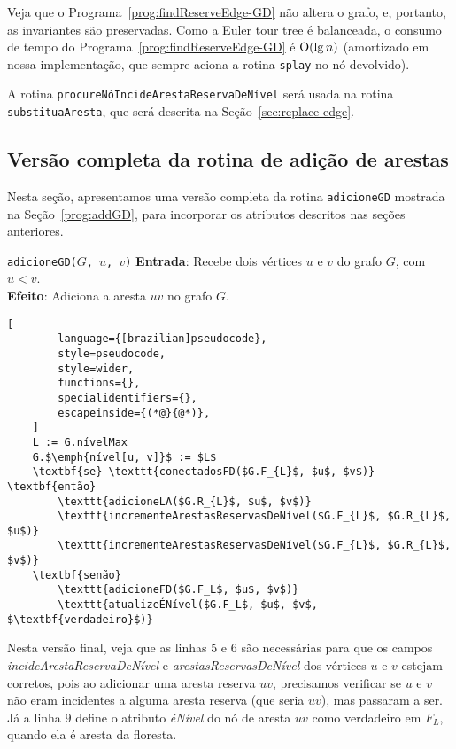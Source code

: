 Veja que o Programa~\ref{prog:findReserveEdge-GD} não altera o grafo, e, portanto, as invariantes são preservadas. Como a Euler tour tree é balanceada, o consumo de tempo do Programa~\ref{prog:findReserveEdge-GD} é $\mathrm{O}(\lg n)$ (amortizado em nossa implementação, que sempre aciona a rotina \texttt{splay} no nó devolvido).

A rotina \texttt{procureNóIncideArestaReservaDeNível} será usada na rotina \texttt{substituaAresta}, que será descrita na Seção~\ref{sec:replace-edge}.

\subsection{Versão completa da rotina de adição de arestas}
\label{sec:code-edge-addition-second-version}

Nesta seção, apresentamos uma versão completa da rotina \texttt{adicioneGD} mostrada na Seção~\ref{prog:addGD}, para incorporar os atributos descritos nas seções anteriores.

\begin{programruledcaption}{\texttt{adicioneGD($G$, $u$, $v$)} \label{prog:addGD-version2}}
    \noindent\textbf{Entrada}: Recebe dois vértices $u$ e $v$ do grafo $G$, com $u < v$. \\
    \textbf{Efeito}: Adiciona a aresta $uv$ no grafo $G$.
    \vspace{-0.5\baselineskip}
    \begin{lstlisting}[
        language={[brazilian]pseudocode},
        style=pseudocode,
        style=wider,
        functions={},
        specialidentifiers={},
        escapeinside={(*@}{@*)},
    ]
    L := G.nívelMax
    G.$\emph{nível[u, v]}$ := $L$
    \textbf{se} \texttt{conectadosFD($G.F_{L}$, $u$, $v$)} \textbf{então}
        \texttt{adicioneLA($G.R_{L}$, $u$, $v$)}
        \texttt{incrementeArestasReservasDeNível($G.F_{L}$, $G.R_{L}$, $u$)}
        \texttt{incrementeArestasReservasDeNível($G.F_{L}$, $G.R_{L}$, $v$)}
    \textbf{senão}
        \texttt{adicioneFD($G.F_L$, $u$, $v$)}
        \texttt{atualizeÉNível($G.F_L$, $u$, $v$, $\textbf{verdadeiro}$)}
    \end{lstlisting}
    \vspace{-0.5\baselineskip}
\end{programruledcaption}

Nesta versão final, veja que as linhas $5$ e $6$ são necessárias para que os campos \textit {incideArestaReservaDeNível} e \textit{arestasReservasDeNível} dos vértices $u$ e $v$ estejam corretos, pois ao adicionar uma aresta reserva $uv$, precisamos verificar se $u$ e $v$ não eram incidentes a alguma aresta reserva (que seria $uv$), mas passaram a ser. Já a linha $9$ define o atributo \textit{éNível} do nó de aresta $uv$ como verdadeiro em $F_L$, quando ela é aresta da floresta. 

